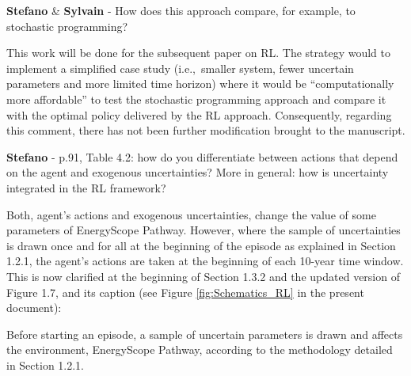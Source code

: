 \documentclass[12pt,a4paper]{article}
\def\ie{i.e.,\ }
\begin{document}
\begin{mdframed}[style=comment] %
{\color{orange} \textbf{Stefano}} \& {\color{purple} \textbf{Sylvain}} - How does this approach compare, for example, to stochastic programming?
\end{mdframed}

\noindent This work will be done for the subsequent paper on RL. The strategy would to implement a simplified case study (\ie smaller system, fewer uncertain parameters and more limited time horizon) where it would be ``computationally more affordable'' to test the stochastic programming approach and compare it with the optimal policy delivered by the RL approach. Consequently, regarding this comment, there has not been further modification brought to the manuscript.

\begin{mdframed}[style=comment] %
{\color{orange} \textbf{Stefano}} - p.91, Table 4.2: how do you differentiate between actions that depend on the agent and exogenous uncertainties? More in general: how is uncertainty integrated in the RL framework?
\end{mdframed}

\noindent Both, agent's actions and exogenous uncertainties, change the value of some parameters of EnergyScope Pathway. However, where the sample of uncertainties is drawn once and for all at the beginning of the episode as explained in Section 1.2.1, the agent's actions are taken at the beginning of each 10-year time window. This is now clarified {\color{blue}at the beginning of Section 1.3.2 and the updated version of Figure 1.7, and its caption} (see Figure \ref{fig:Schematics_RL} in the present document):

\begin{mdframed}[style=manuscript] %
Before starting an episode, a sample of uncertain parameters is drawn and affects the environment, EnergyScope Pathway, according to the methodology detailed in Section 1.2.1. 
\end{mdframed}
\end{document}
